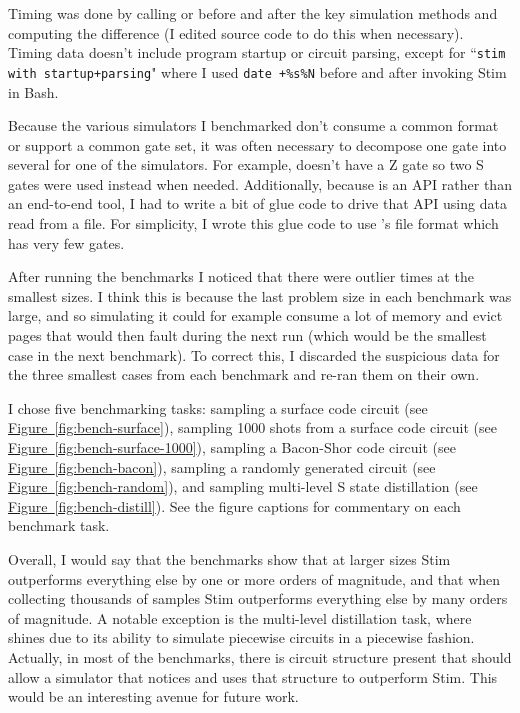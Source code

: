 \documentclass[onecolumn,unpublished]{quantumarticle}
\theoremstyle{definition}
\theoremstyle{definition}
\theoremstyle{definition}
\newcommand{\fig}[1]{\hyperref[fig:#1]{Figure~\ref*{fig:#1}}}
\begin{document}
Timing was done by calling  or  before and after the key simulation methods and computing the difference (I edited source code to do this when necessary).
Timing data doesn't include program startup or circuit parsing, except for ``\texttt{stim with startup+parsing}" where I used \texttt{date +\%s\%N} before and after invoking Stim in Bash.

Because the various simulators I benchmarked don't consume a common format or support a common gate set, it was often necessary to decompose one gate into several for one of the simulators.
For example,  doesn't have a Z gate so two S gates were used instead when needed.
Additionally, because  is an API rather than an end-to-end tool, I had to write a bit of glue code to drive that API using data read from a file.
For simplicity, I wrote this glue code to use 's file format which has very few gates.

After running the benchmarks I noticed that there were outlier times at the smallest sizes.
I think this is because the last problem size in each benchmark was large, and so simulating it could for example consume a lot of memory and evict pages that would then fault during the next run (which would be the smallest case in the next benchmark).
To correct this, I discarded the suspicious data for the three smallest cases from each benchmark and re-ran them on their own.

I chose five benchmarking tasks: sampling a surface code circuit (see \fig{bench-surface}), sampling 1000 shots from a surface code circuit (see \fig{bench-surface-1000}), sampling a Bacon-Shor code circuit (see \fig{bench-bacon}), sampling a randomly generated circuit (see \fig{bench-random}), and sampling multi-level S state distillation (see \fig{bench-distill}).
See the figure captions for commentary on each benchmark task.

Overall, I would say that the benchmarks show that at larger sizes Stim outperforms everything else by one or more orders of magnitude, and that when collecting thousands of samples Stim outperforms everything else by many orders of magnitude.
A notable exception is the multi-level distillation task, where  shines due to its ability to simulate piecewise circuits in a piecewise fashion.
Actually, in most of the benchmarks, there is circuit structure present that should allow a simulator that notices and uses that structure to outperform Stim.
This would be an interesting avenue for future work.
\end{document}
